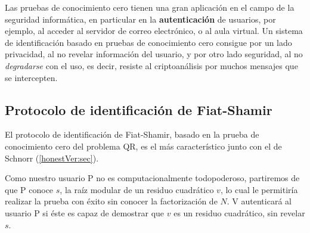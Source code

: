 Las pruebas de conocimiento cero tienen una gran aplicación en el campo de la seguridad informática, en particular en la \textbf{autenticación} de usuarios, por ejemplo, al acceder al servidor de correo electrónico, o al aula virtual. Un sistema de identificación basado en pruebas de conocimiento cero consigue por un lado privacidad, al no revelar información del usuario, y por otro lado seguridad, al no \textit{degradarse} con el uso, es decir, resiste al criptoanálisis por muchos mensajes que se intercepten.




\subsection{Protocolo de identificación de Fiat-Shamir}

El protocolo de identificación de Fiat-Shamir, basado en la prueba de conocimiento cero del problema QR, es el más característico junto con el de Schnorr (\autoref{honestVer:sec}).

Como nuestro usuario P no es computacionalmente todopoderoso, partiremos de que P conoce $s$, la raíz modular de un residuo cuadrático $v$, lo cual le permitiría realizar la prueba con éxito sin conocer la factorización de $N$. V autenticará al usuario P si éste es capaz de demostrar que $v$ es un residuo cuadrático, sin revelar $s$.


